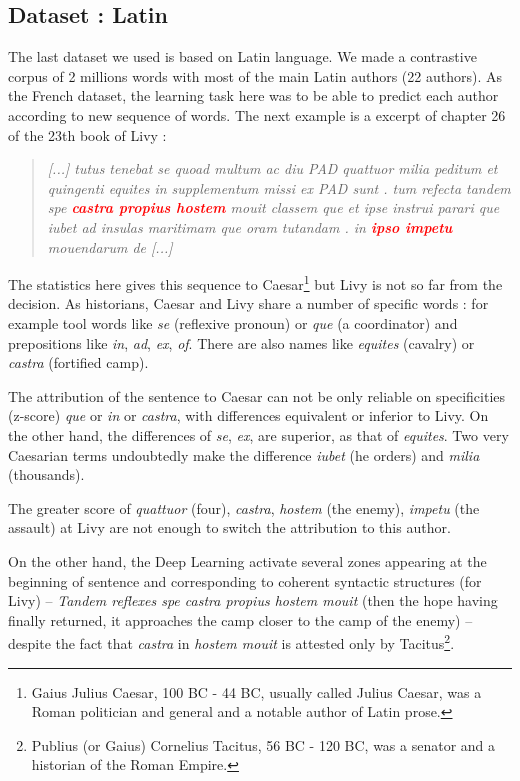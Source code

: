 \subsection{Dataset : Latin}

The last dataset we used is based on Latin language. We made a contrastive corpus of 2 millions words with most of the main Latin authors (22 authors). As the French dataset, the learning task here was to be able to predict each author according to new sequence of words. The next example is a excerpt of chapter 26 of the 23th book of Livy :

\begin{quote}
\textit{[...] tutus tenebat se quoad multum ac diu PAD quattuor milia peditum et quingenti equites in supplementum missi ex PAD sunt . tum refecta tandem spe \textcolor{red}{\textbf{castra propius hostem}} mouit classem que et ipse instrui parari que iubet ad insulas maritimam que oram tutandam . in \textcolor{red}{\textbf{ipso impetu}} mouendarum de [...]} 
\end{quote}

The statistics here gives this sequence to Caesar\footnote{Gaius Julius Caesar, 100 BC - 44 BC, usually called Julius Caesar, was a Roman politician and general and a notable author of Latin prose.} but Livy is not so far from the decision. As historians, Caesar and Livy share a number of specific words : for example tool words like \textit{se} (reflexive pronoun) or \textit{que} (a coordinator) and prepositions like \textit{in}, \textit{ad}, \textit{ex}, \textit{of}. There are also names like \textit{equites} (cavalry) or \textit{castra} (fortified camp).

The attribution of the sentence to Caesar can not be only reliable on specificities (z-score) \textit{que} or \textit{in} or \textit{castra}, with differences equivalent or inferior to Livy. On the other hand, the differences of \textit{se}, \textit{ex}, are superior, as that of \textit{equites}. Two very Caesarian terms undoubtedly make the difference \textit{iubet} (he orders) and \textit{milia} (thousands).

The greater score of \textit{quattuor} (four), \textit{castra}, \textit{hostem} (the enemy), \textit{impetu} (the assault) at Livy are not enough to switch the attribution to this author.

On the other hand, the Deep Learning activate several zones appearing at the beginning of sentence and corresponding to coherent syntactic structures (for Livy) -- \textit{Tandem reflexes spe castra propius hostem mouit} (then the hope having finally returned, it approaches the camp closer to the camp of the enemy) -- despite the fact that \textit{castra} in \textit{hostem mouit} is attested only by Tacitus\footnote{Publius (or Gaius) Cornelius Tacitus, 56 BC - 120 BC, was a senator and a historian of the Roman Empire.}. 

